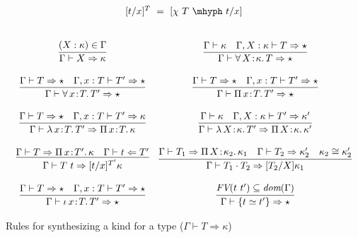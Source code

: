\documentclass{article}
\newcommand{\abs}[4]{{#1}\, #2\! : \! #3.\, #4}
\newcommand{\tpcheck}[0]{\Leftarrow}
\newcommand{\tpsynth}[0]{\Rightarrow}
\begin{document}
\begin{figure}
  \[
    \begin{array}{c}
      [t/x]^T\ =\ [\chi\ T\ \mhyph\ t/x]
      \\ \\ \\
  \begin{array}{cc}
    \infer{\Gamma \vdash X \tpsynth \kappa}{(X : \kappa) \in \Gamma} &
    \infer{\Gamma\vdash \abs{\forall}{X}{\kappa}{T} \tpsynth \star}{\Gamma \vdash \kappa & \Gamma,X:\kappa\vdash T \tpsynth \star} \\ \\
    \infer{\Gamma\vdash\abs{\forall}{x}{T}{T'} \tpsynth \star}{\Gamma \vdash T \tpsynth \star & \Gamma,x:T\vdash T' \tpsynth \star} &
    \infer{\Gamma\vdash\abs{\Pi}{x}{T}{T'} \tpsynth \star}{\Gamma \vdash T \tpsynth \star & \Gamma,x:T\vdash T' \tpsynth \star} \\ \\
    \infer{\Gamma\vdash\abs{\lambda}{x}{T}{T'} \tpsynth \abs{\Pi}{x}{T}{\kappa}}{\Gamma \vdash T \tpsynth \star & \Gamma,x:T\vdash T'\tpsynth\kappa} &
    \infer{\Gamma\vdash\abs{\lambda}{X}{\kappa}{T'} \tpsynth \abs{\Pi}{X}{\kappa}{\kappa'}}{\Gamma \vdash \kappa & \Gamma,X:\kappa\vdash T'\tpsynth\kappa'} \\ \\
    \infer{\Gamma\vdash T\ t \tpsynth [t/x]^{T'}\kappa}{\Gamma\vdash T \tpsynth \abs{\Pi}{x}{T'}{\kappa} & \Gamma\vdash t \tpcheck T'} &
    \infer{\Gamma\vdash T_1 \cdot T_2 \tpsynth [T_2/X]\kappa_1}{\Gamma\vdash T_1 \tpsynth \abs{\Pi}{X}{\kappa_2}{\kappa_1} & \Gamma\vdash T_2 \tpsynth \kappa_2' & \kappa_2 \cong \kappa_2'} \\ \\
    \infer{\Gamma\vdash\abs{\iota}{x}{T}{T'} \tpsynth \star}{\Gamma \vdash T \tpsynth \star & \Gamma,x:T\vdash T' \tpsynth \star} &
    \infer{\Gamma\vdash \{ t \simeq t' \} \tpsynth \star}{\textit{FV}(t\ t')\subseteq\textit{dom}(\Gamma)}
  \end{array}
    \end{array}
  \]
  \caption{Rules for synthesizing a kind for a type ($\Gamma \vdash T \tpsynth \kappa$)}
  \label{fig:knd}
\end{figure}
\end{document}
